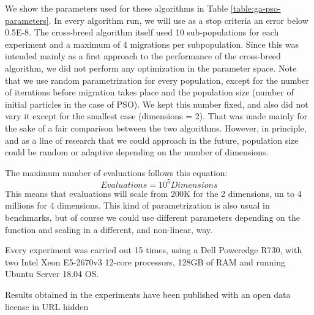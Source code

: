\documentclass[runningheads]{llncs}
\begin{document}
We show the parameters used for these algorithms in Table
\ref{table:ga-pso-parameters}. In every algorithm run, we will use as a stop
criteria an error below 0.5E-8. The cross-breed algorithm itself used 10
sub-populations for each experiment and a maximum of 4 migrations per
subpopulation. Since this was intended mainly as a first approach to the
performance of the cross-breed algorithm, we did not perform any optimization in
the parameter space. Note that we use random parametrization for every
population, except for the number of iterations before migration takes place and
the population size (number of initial particles in the case of PSO). 
We kept this number fixed, and also did not vary it except for the smallest case
(dimensions = 2). That was made mainly for the sake of a fair
comparison between the two algorithms. However, in principle, and as a line of
research that we could approach in the future, population size could be
random or adaptive depending on the number of dimensions.

The maximum number of evaluations follows this equation:
\begin{equation}
    \label{eq:hesitancy-interpretation}
   Evaluations = 10^{5} Dimensions
   \end{equation}
This means that evaluations will scale from 200K for the 2 dimensions,
un to 4 millions for 4 dimensions.  This kind of parametrization is
also usual in benchmarks, but of course we could use different
parameters depending on the function and scaling in a different, and
non-linear, way. 

Every experiment was carried out 15 times, using a Dell Poweredge
R730, with two Intel Xeon E5-2670v3 12-core processors, 128GB of RAM and
running Ubuntu Server 18.04 OS.

Results obtained in the experiments have been published with an open
data license in {URL hidden}
\end{document}
